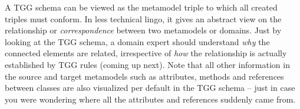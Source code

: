 A TGG schema can be viewed as the metamodel triple to which all created triples must conform. In less technical lingo, it gives an abstract view on the
relationship or \emph{correspondence} between two metamodels or domains. Just by looking at the TGG schema, a domain expert should understand \emph{why} the
connected elements are related, irrespective of \emph{how} the relationship is actually established by TGG rules (coming up next). Note that all other
information in the source and target metamodels such as attributes, methods and references between classes are also visualized per default in the TGG schema --
just in case you were wondering where all the attributes and references suddenly came from.
